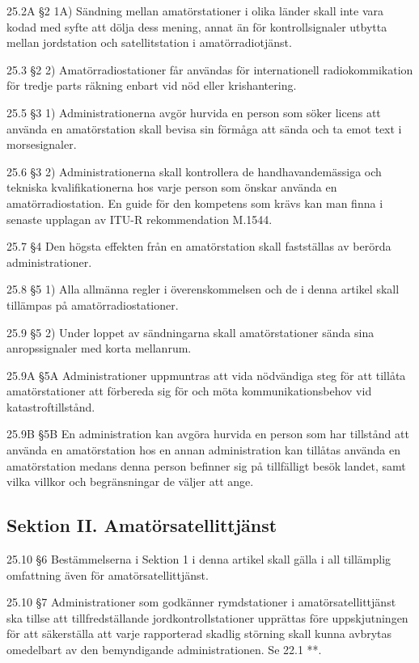 25.2A §2 1A) Sändning mellan amatörstationer i olika länder skall
inte vara kodad med syfte att dölja dess mening, annat än för kontrollsignaler
utbytta mellan jordstation och satellitstation i amatörradiotjänst.
\cite[25.2A]{ITU-RR}

25.3 §2 2) Amatörradiostationer får användas för internationell
radiokommikation för tredje parts räkning enbart vid nöd eller
krishantering.
\cite[25.3]{ITU-RR}

25.5 §3 1) Administrationerna avgör hurvida en person som söker licens
att använda en amatörstation skall bevisa sin förmåga att sända och ta
emot text i morsesignaler.
\cite[25.5]{ITU-RR}

25.6 §3 2) Administrationerna skall kontrollera de handhavandemässiga och
tekniska kvalifikationerna hos varje person som önskar använda en
amatörradiostation. En guide för den kompetens som krävs kan man finna i
senaste upplagan av ITU-R rekommendation M.1544.
\cite[25.6]{ITU-RR}

25.7 §4 Den högsta effekten från en amatörstation skall fastställas
av berörda administrationer.
\cite[25.7]{ITU-RR}

25.8 §5 1) Alla allmänna regler i överenskommelsen och de i denna
artikel skall tillämpas på amatörradiostationer.
\cite[25.8]{ITU-RR}

25.9 §5 2) Under loppet av sändningarna skall amatörstationer sända
sina anropssignaler med korta mellanrum.
\cite[25.9]{ITU-RR}

25.9A §5A Administrationer uppmuntras att vida nödvändiga steg för att
tillåta amatörstationer att förbereda sig för och möta kommunikationsbehov
vid katastroftillstånd.
\cite[25.9A]{ITU-RR}

25.9B §5B En administration kan avgöra hurvida en person som har tillstånd
att använda en amatörstation hos en annan administration kan tillåtas använda
en amatörstation medans denna person befinner sig på tillfälligt besök landet,
samt vilka villkor och begränsningar de väljer att ange.
\cite[25.9B]{ITU-RR}

\subsection{Sektion II. Amatörsatellittjänst}

25.10 §6 Bestämmelserna i Sektion 1 i denna artikel skall gälla i all
tillämplig omfattning även för amatörsatellittjänst.
\cite[25.10]{ITU-RR}

25.10 §7 Administrationer som godkänner rymdstationer i amatörsatellittjänst
ska tillse att tillfredställande jordkontrollstationer upprättas före
uppskjutningen för att säkerställa att varje rapporterad skadlig störning
skall kunna avbrytas omedelbart av den bemyndigande administrationen.
Se 22.1 **.
\cite[25.11]{ITU-RR}

